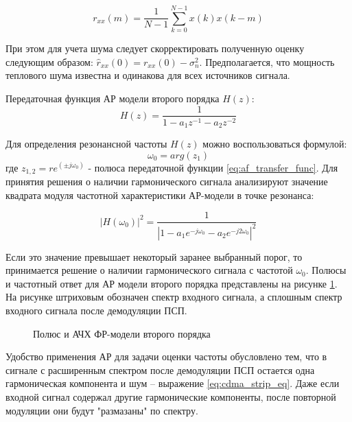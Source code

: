 \begin{equation}
	\label{eq:af_acf_est}
	r_{xx}(m) = \frac{1}{N-1}\sum \limits_{k=0}^{N-1}x(k)x(k-m)
\end{equation}

При этом для учета шума следует скорректировать полученную оценку следующим образом: ${\hat{r}_{xx}(0) = r_{xx}(0) - \sigma_n^2}$.
Предполагается, что мощность теплового шума известна и одинакова для всех источников сигнала. 

Передаточная функция АР модели второго порядка ${H(z)}$:
\begin{equation}
	\label{eq:af_transfer_func}
	H(z) = \frac{1}{1 - a_1 z^{-1} - a_2 z^{-2}}
\end{equation}

Для определения резонансной частоты ${H(z)}$ можно воспользоваться формулой:
\begin{equation}
	\label{eq:af_omega}
	\omega_0 = arg(z_1)
\end{equation}
где ${z_{1,2} = re^{(\pm j \omega_0)}}$ - полюса передаточной функции \ref{eq:af_transfer_func}. Для принятия решения о наличии гармонического сигнала
анализируют значение квадрата модуля частотной характеристики АР-модели в точке резонанса:

\begin{equation}
	\label{eq:af_transfer_func}
	\left| H(\omega_0) \right| ^2 = \frac{1}{ \left| 1 - a_1 e^{-j \omega_0} - a_2 e^{-j2 \omega_0} \right| ^2}
\end{equation}

Если это значение превышает некоторый заранее выбранный порог, то принимается решение о наличии гармонического сигнала с частотой ${\omega_0}$.
Полюсы и частотный ответ для АР модели второго порядка представлены на рисунке \ref{pic:ar_poles_afc}. На рисунке штриховым обозначен
спектр входного сигнала, а сплошным спектр входного сигнала после демодуляции ПСП.

\begin{figure}[H]
	\center{}
	\caption{Полюс и АЧХ ФР-модели второго порядка}
	\label{pic:ar_poles_afc}
\end{figure}

Удобство применения АР для задачи оценки частоты обусловлено тем, что в сигнале с расширенным спектром после демодуляции ПСП остается одна
гармоническая компонента и шум – выражение \ref{eq:cdma_strip_eq}.  Даже если входной сигнал содержал другие гармонические компоненты,
после повторной модуляции они будут "размазаны" по спектру.
